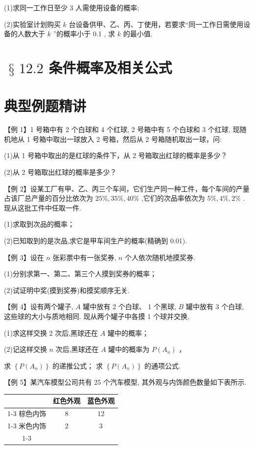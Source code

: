 (1)求同一工作日至少 3 人需使用设备的概率;

(2)实验室计划购买 $k$ 台设备供甲、乙、丙、丁使用，若要求“同一工作日需使用设备的人数大于 $k$ ”的概率小于 0.1 , 求 $k$ 的最小值.

\section*{$\text{ § }{12.2}$ 条件概率及相关公式}

\section*{典型例题精讲}

【例 1】1 号箱中有 2 个白球和 4 个红球, 2 号箱中有 5 个白球和 3 个红球, 现随机地从 1 号箱中取出一球放入 2 号箱，然后从 2 号箱随机取出一球，问:

(1)从 1 号箱中取出的是红球的条件下，从 2 号箱取出红球的概率是多少？

(2)从 2 号箱取出红球的概率是多少？

【例 2】设某工厂有甲、乙、丙三个车间，它们生产同一种工件，每个车间的产量占该厂总产量的百分比依次为 ${25}\% ,{35}\% ,{40}\%$ ,它们的次品率依次为 $5\% ,4\% ,2\%$ . 现从这批工件中任取一件.

(1)求取到次品的概率；

(2)已知取到的是次品,求它是甲车间生产的概率(精确到 0.01).

【例 3】设在 $n$ 张彩票中有一张奖券, $n$ 个人依次随机地摸奖券.

(1)分别求第一、第二、第三个人摸到奖券的概率；

(2)试证明中奖(摸到奖券)和摸奖顺序无关.

【例 4】设有两个罐子, $A$ 罐中放有 2 个白球、 1 个黑球, $B$ 罐中放有 3 个白球,这些球的大小与质地相同. 现从两个罐子中各摸 1 个球并交换,

(1)求这样交换 2 次后,黑球还在 $A$ 罐中的概率；

(2)记这样交换 $n$ 次后,黑球还在 $A$ 罐中的概率为 $P\left( {A}_{n}\right)$ ，

   求 $\left\{  {P\left( {A}_{n}\right) }\right\}$ 的递推公式；   求 $\left\{  {P\left( {A}_{n}\right) }\right\}$ 的通项公式.

【例 5】某汽车模型公司共有 25 个汽车模型, 其外观与内饰颜色数量如下表所示.

\begin{center}
\begin{tabular}{|c|c|c|}
\hline
\phantom{X} & 红色外观 & 蓝色外观 \\
\cline{1-3}
棕色内饰 & 8 & 12 \\
\cline{1-3}
米色内饰 & 2 & 3 \\
\cline{1-3}
\hline
\end{tabular}
\end{center}

